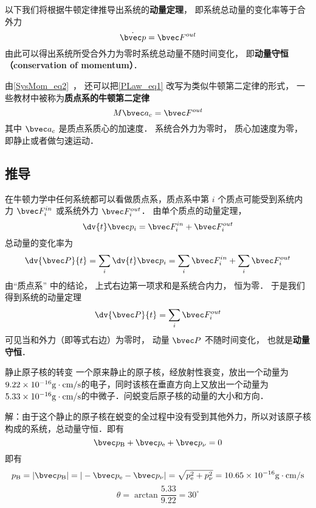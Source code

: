 
以下我们将根据牛顿定律推导出系统的\textbf{动量定理}， 即系统总动量的变化率等于合外力
\begin{equation}\label{PLaw_eq1}
\dot {\bvec p} = \bvec F^{out}
\end{equation}
由此可以得出系统所受合外力为零时系统总动量不随时间变化， 即\textbf{动量守恒（conservation of momentum）}．

由\autoref{SysMom_eq2}~， 还可以把\autoref{PLaw_eq1} 改写为类似牛顿第二定律的形式， 一些教材中被称为\textbf{质点系的牛顿第二定律}
\begin{equation}\label{PLaw_eq2}
M \bvec a_c = \bvec F^{out}
\end{equation}
其中 $\bvec a_c$ 是质点系质心的加速度． 系统合外力为零时， 质心加速度为零， 即静止或者做匀速运动．

\subsection{推导}
在牛顿力学中任何系统都可以看做质点系，质点系中第 $i$ 个质点可能受到系统内力 $\bvec F_i^{in}$ 或系统外力 $\bvec F_i^{out}$． 由单个质点的动量定理，
\begin{equation}
\dv{t} \bvec p_i = \bvec F_i^{in} + \bvec F_i^{out}
\end{equation}
总动量的变化率为
\begin{equation}
\dv{\bvec P}{t} = \sum_i \dv{t} \bvec p_i  = \sum_i \bvec F_i^{in}  + \sum_i \bvec F_i^{out}
\end{equation}
由“质点系” 中的结论， 上式右边第一项求和是系统合内力， 恒为零． 于是我们得到系统的动量定理
\begin{equation}
\dv{\bvec P}{t} = \sum_i \bvec F_i^{out}
\end{equation}
可见当和外力（即等式右边）为零时， 动量 $\bvec P$ 不随时间变化， 也就是\textbf{动量守恒}．

\begin{example}{静止原子核的转变}
一个原来静止的原子核，经放射性衰变，放出一个动量为$9.22\times 10^{-16}{\rm g\cdot cm/s}$的电子，同时该核在垂直方向上又放出一个动量为$5.33\times 10^{-16}{\rm g\cdot cm/s}$的中微子．问蜕变后原子核的动量的大小和方向．

解：由于这个静止的原子核在蜕变的全过程中没有受到其他外力，所以对该原子核构成的系统，总动量守恒．即有
\begin{equation}
\bvec p_{\rm B}+\bvec p_{\rm e}+\bvec p_{\rm \nu}=0
\end{equation}
即有
\begin{equation}
p_{\rm B}=|\bvec p_{\rm B}|=|-\bvec p_{\rm e}-\bvec p_{\rm \nu}|=\sqrt{p_{\rm e}^{2}+p_{\rm \nu}^{2}}=10.65\times 10^{-16}{\rm g\cdot cm/s}
\end{equation}
\begin{equation}
\theta=\arctan\frac{5.33}{9.22}=30^\circ
\end{equation}
\end{example}

